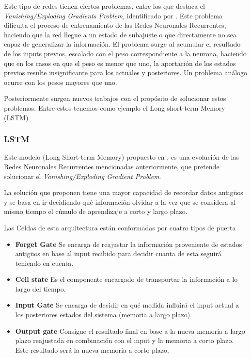 Este tipo de redes tienen ciertos problemas, entre los que destaca el \textit{Vanishing/Exploding Gradients Problem}, identificado por \cite{hochreiter1991untersuchungen}.  Este problema dificulta el proceso de entrenamiento de las Redes Neuronales Recurrentes, haciendo que la red llegue a un estado de subajuste o que directamente no sea capaz de generalizar la información. El problema surge al acumular el resultado de los inputs previos, escalado con el peso correspondiente a la neurona, haciendo que en los casos en que el peso es menor que uno, la aportación de los estados previos resulte insignificante para los actuales y posteriores. Un problema análogo ocurre con los pesos mayores que uno.

Posteriormente surgen nuevos trabajos con el propósito de solucionar estos problemas. Entre estos tenemos como ejemplo el Long short-term Memory (LSTM)

\subsubsection{LSTM}

Este modelo (Long Short-term Memory) propuesto en \cite{hochreiter1997long}, es una evolución de las Redes Neuronales Recurrentes mencionadas anteriormente, que pretende solucionar el \textit{Vanishing/Exploding Gradient Problem}.

La solución que proponen tiene una mayor capacidad de recordar datos antigüos y se basa en ir decidiendo qué información olvidar a la vez que se considera al mismo tiempo el cúmulo de aprendizaje a corto y largo plazo.

Las Celdas de esta arquitectura están conformadas por cuatro tipos de puerta
\begin{itemize}
	\item\textbf{Forget Gate} Se encarga de reajustar la información proveniente de estados antigüos en base al input recibido para decidir cuanta de esta seguirá teniendo en cuenta.
	\item\textbf{Cell state} Es el componente encargado de transportar la información a lo largo del tiempo.
	\item\textbf{Input Gate} Se encarga de decidir en qué medida influirá el input actual a los posteriores estados del sistema (memoria a largo plazo)
	\item\textbf{Output gate} Consigue el resultado final en base a la nueva memoria a largo plazo reajustada en combinación con el input y la memoria a corto plazo. Este resultado será la nueva memoria a corto plazo.
\end{itemize}

